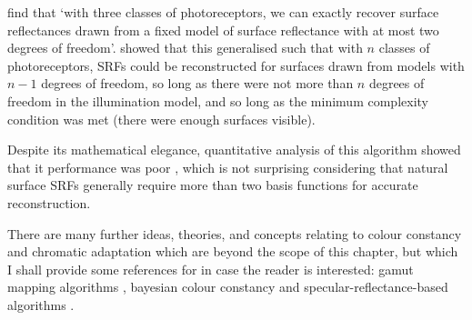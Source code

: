 \citet{maloney_color_1986} find that `with three classes of photoreceptors, we can exactly recover surface reflectances drawn from a fixed model of surface reflectance with at most two degrees of freedom'. \citet{maloney_computational_1984} showed that this generalised such that with $n$ classes of photoreceptors, \glspl{SRF} could be reconstructed for surfaces drawn from models with $n-1$ degrees of freedom, so long as there were not more than $n$ degrees of freedom in the illumination model, and so long as the minimum complexity condition was met (there were enough surfaces visible).

Despite its mathematical elegance, quantitative analysis of this algorithm showed that it performance was poor \cite{brainard_bayesian_1994, finlayson_color_1995}, which is not surprising considering that natural surface \glspl{SRF} generally require more than two basis functions for accurate reconstruction.

\bigskip

There are many further ideas, theories, and concepts relating to colour constancy and chromatic adaptation which are beyond the scope of this chapter, but which I shall provide some references for in case the reader is interested: gamut mapping algorithms \citep{forsyth_colour_1990,forsyth_novel_1990,forsyth_colour_1989,finlayson_color_1996}, bayesian colour constancy \citep{finlayson_color_2001, brainard_bayesian_2006,gazzaniga_bayesian_2009, brainard_bayesian_1994,gehler_bayesian_2008} and specular-reflectance-based algorithms \citep{mollon_monge_2006, morimoto_discrimination_2018,hurlbert_computational_1998}.






